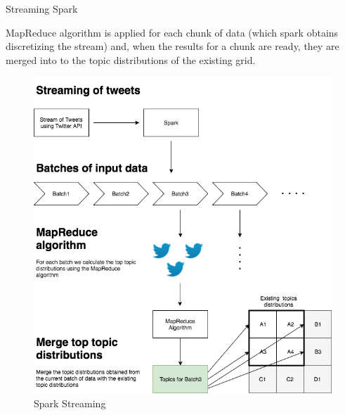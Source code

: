 \documentclass[final]{beamer}
\newlength{\onecolwid}
\newlength{\twocolwid}
\begin{document}
\begin{frame}[t]
\begin{columns}[t]
\begin{column}{\twocolwid}
\begin{columns}[t,totalwidth=\twocolwid]
\begin{column}{\onecolwid}

\begin{block}{ Streaming Spark}

MapReduce algorithm is applied for each chunk of data (which spark obtains discretizing the stream) and, when the results for a chunk are ready, they are merged into to the topic distributions of the existing grid.

\begin{figure}[h]
	\includegraphics[]{images/streamingspark3}
	\caption{Spark Streaming}
\end{figure}

\end{block}


\end{column} %

\end{columns} %

\end{column} %


\end{columns}
\end{frame}
\end{document}
